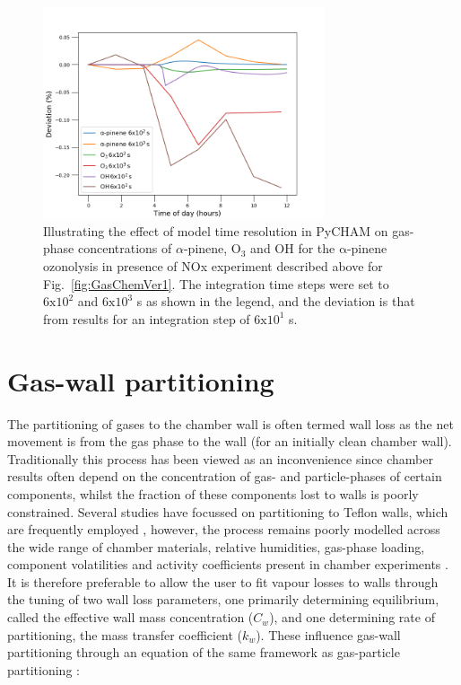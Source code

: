 \documentclass[gmd, manuscript]{copernicus}
\begin{document}
\begin{figure}[t]
\includegraphics[width=8.3cm]{Results/photo_chem_time_res.png}
\caption{Illustrating the effect of model time resolution in PyCHAM on gas-phase concentrations of $\alpha$-pinene, $\mathrm{O_3}$ and OH for the $\mathrm{\alpha}$-pinene ozonolysis in presence of NOx experiment described above for Fig.~\ref{fig:GasChemVer1}.  The integration time steps were set to $\mathrm{6x10^2}$ and $\mathrm{6x10^3}$ s as shown in the legend, and the deviation is that from results for an integration step of $\mathrm{6x10^1}$ s.}
\label{fig:GasChemTimeRes}
\end{figure}

\section{Gas-wall partitioning}

The partitioning of gases to the chamber wall is often termed wall loss as the net movement is from the gas phase to the wall (for an initially clean chamber wall).  Traditionally this process has been viewed as an inconvenience since chamber results often depend on the concentration of gas- and particle-phases of certain components, whilst the fraction of these components lost to walls is poorly constrained.  Several studies have focussed on partitioning to Teflon walls, which are frequently employed \citep{Matsunaga2010, Zhang2015b, Zhao2018}, however, the process remains poorly modelled across the wide range of chamber materials, relative humidities, gas-phase loading, component volatilities and activity coefficients present in chamber experiments \citep[e.g.][]{Day2017, Stefenelli2018}.  It is therefore preferable to allow the user to fit vapour losses to walls through the tuning of two wall loss parameters, one primarily determining equilibrium, called the effective wall mass concentration ($C_w$), and one determining rate of partitioning, the mass transfer coefficient ($k_w$).  These influence gas-wall partitioning through an equation of the same framework as gas-particle partitioning \citep{Zaveri2008}:
\end{document}
